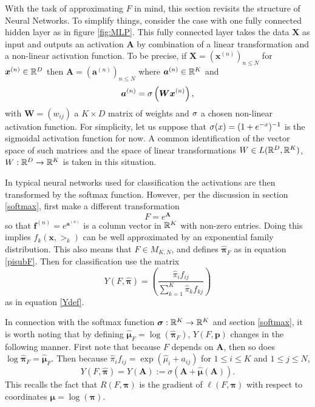With the task of approximating \( F \) in mind, this section revisits the structure of Neural Networks.  To simplify things, consider the case with one fully connected hidden layer as in figure \ref{fig:MLP}.  This fully connected layer takes the data $\bm X$ as input and outputs an activation $\bm A$ by combination of a linear transformation and a non-linear activation function.  To be precise, if $\bm X=(\bm x^{(n)})_{n\leq N}$ for $\bm x^{(n)}\in \mathbb R^{D}$ then $\bm A=(\bm a^{(n)})_{n\leq N}$ where $\bm a^{(n)}\in \mathbb R^{K}$ and
\[\bm a^{(n)}=\sigma\left(\bm W\bm x^{(n)}\right),\]
with $\bm W=(w_{ij})$ a $K\times D$ matrix of weights and \( \sigma \) a chosen non-linear activation function. For simplicity, let us suppose that \( \sigma(x) = (1+e^{-x})^{-1} \) is the sigmoidal activation function for now. A common identification of the vector space of such matrices and the space of linear transformations $W\in L(\mathbb R^D,\mathbb R^K)$, $W:\mathbb R^D\rightarrow \mathbb R^K$ is taken in this situation.

In typical neural networks used for classification the activations are then transformed by the softmax function.  However, per the discussion in section \ref{softmax},
first make a different transformation
\[F=e^{\bm A}\]
so that $\bm f^{(n)}=e^{\bm a^{(n)}}$ is a column vector in $\mathbb R^K$ with non-zero entries. Doing this implies \( f_k(\bm x,\bm\gt_k) \) can be well approximated by an exponential family distribution. This also means that $F\in M_{K,N}$, and defines $\hat{\bm\pi}_F$ as in equation \ref{pisubF}. Then for classification use the matrix
\[Y(F,\hat{\bm\pi})=\left(\frac{\hat{\pi}_if_{ij}}{\sum_{k=1}^{K}\hat{\pi}_kf_{kj}}\right)\]
as in equation \ref{Ydef}.  

In connection with the softmax function $\bm\sigma:\mathbb R^K\rightarrow\mathbb R^K$ and section \ref{softmax}, it is worth noting that by defining $\hat{\bm\mu}_F=\log(\hat{\bm\pi}_F)$, $Y(F,\bm p)$ changes in the following manner.  First note that because $F$ depends on $\bm A$, then so does $\log\hat{\bm\pi}_F=\hat{\bm\mu}_F$.  Then because $\hat{\pi}_if_{ij}=\exp(\hat{\mu}_i+a_{ij})$ for $1\leq i\leq K$ and $1\leq j\leq N$, 
\begin{equation}\label{eqn:YdefLogcoords}
Y(F,\hat{\bm\pi})=Y(\bm A):=\sigma(\bm A+\hat{\bm\mu}(\bm A)).
\end{equation}
This recalls the fact that \( R(F,\bm\pi) \) is the gradient of \( \ell(F,\bm\pi) \) with respect to coordinates \( \bm\mu = \log(\bm\pi)  \).

